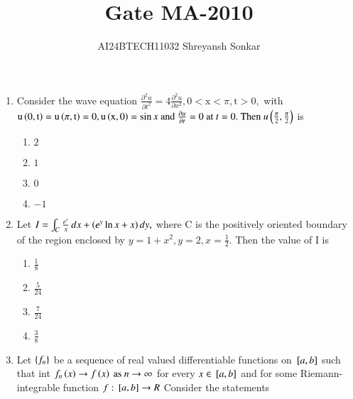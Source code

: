 \documentclass[journal]{IEEEtran}
\begin{document}

\vspace{3cm}


\renewcommand{\thefigure}{\theenumi}
\renewcommand{\thetable}{\theenumi}
\setlength{\intextsep}{10pt} %


\renewcommand{\thetable}{\theenumi}

\title{Gate MA-2010}
\author{AI24BTECH11032 Shreyansh Sonkar
}
\maketitle
\renewcommand{\thefigure}{\theenumi}
\renewcommand{\thetable}{\theenumi}
\begin{enumerate}[start=40]
\item Consider the wave equation $\frac{\partial^{2}u}{\partial t^{2}}=4\frac{\partial^{2}u}{\partial x^{2}},0<\text{x}<\pi,\text{t}>0,$ with $\text{u}\left(0,\text{t}\right)=\text{u}\left(\pi,\text{t}\right)=0,\text{u}\left(\text{x},0\right)=\sin x \text{ and }\frac{\partial u}{\partial t}=0 \text{ at } t=0.\text{ Then } u\left(\frac{\pi}{2},\frac{\pi}{2}\right)$ is
\begin{multicols}{4}
    \begin{enumerate}
        \item $2$
        \item $1$
        \item $0$
        \item $-1$
    \end{enumerate}
\end{multicols}
\bigskip
\item Let $I=\int_ {C} \frac{e^{\prime}}{x} \, dx + \left(e^{y}\ln x +x\right)dy,$ where C is the positively oriented  boundary of the region enclosed by $y=1+x^{2},y=2,x=\frac{1}{2}.$ Then the value of I is 
\begin{multicols}{4}
    \begin{enumerate}
        \item $\frac{1}{8}$
        \item $\frac{5}{24}$
        \item $\frac{7}{24}$
        \item $\frac{3}{8}$
    \end{enumerate}
\end{multicols}
\bigskip
\item Let $\left\{f_{n}\right\}$ be a sequence of real valued differentiable functions on ${}\left[a,b\right]$ such that int $f_{n}\left(x\right)\to f\left(x\right) \text{ as } n \to \infty$ for every $x \in {}\left[a, b\right]$ and for some Riemann-integrable function $f : {}\left[a, b\right] \to R$ Consider the statements

\end{enumerate}
\end{document}
